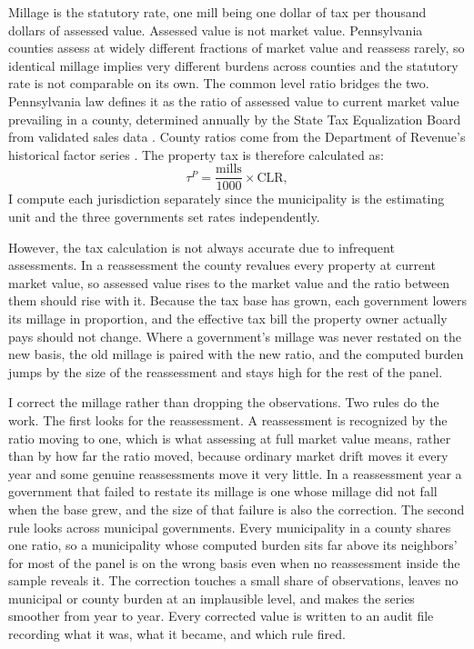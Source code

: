 \documentclass[12pt]{article}
\begin{document}
Millage is the statutory rate, one mill being one dollar of tax per
thousand dollars of assessed value. Assessed value is not market value.
Pennsylvania counties assess at widely different fractions of market
value and reassess rarely, so identical millage implies very different
burdens across counties and the statutory rate is not comparable on its
own. The common level ratio bridges the two. Pennsylvania law defines it
as the ratio of assessed value to current market value prevailing in a
county, determined annually by the State Tax Equalization Board from
validated sales data \citep{padcedSTEB}. County ratios come from the
Department of Revenue's historical factor series \citep{padorCLR}. The property tax is therefore calculated as:
%
\begin{equation}
\tau^{P} = \frac{\text{mills}}{1000} \times \text{CLR},
\label{eq:eff_property}
\end{equation}
%
I compute each jurisdiction separately since the municipality is the estimating unit and the three
governments set rates independently.

However, the tax calculation is not always accurate due to infrequent assessments. In a
reassessment the county revalues every property at current market value,
so assessed value rises to the market value and the ratio between them
should rise with it. Because the tax base has grown, each government
lowers its millage in proportion, and the effective tax bill the property owner
actually pays should not change. Where a government's millage was
never restated on the new basis, the old millage is paired with the new
ratio, and the computed burden jumps by the size of the reassessment and
stays high for the rest of the panel.

I correct the millage rather than dropping the observations. Two rules do the work. The first looks for
the reassessment. A reassessment is recognized by the ratio moving to
one, which is what assessing at full market value means, rather than by
how far the ratio moved, because ordinary market drift moves it every
year and some genuine reassessments move it very little. In a
reassessment year a government that failed to restate its millage is one
whose millage did not fall when the base grew, and the size of that
failure is also the correction. The second rule looks across
municipal governments. Every municipality in a county shares one ratio, so a
municipality whose computed burden sits far above its neighbors' for most
of the panel is on the wrong basis even when no reassessment inside the
sample reveals it. The correction touches a small share of observations,
leaves no municipal or county burden at an implausible level, and makes
the series smoother from year to year. Every corrected value is written
to an audit file recording what it was, what it became, and which rule
fired.
\end{document}
